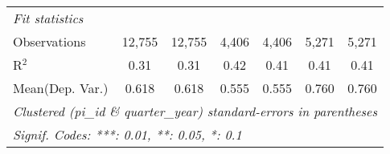 \begin{tabular}{lcccccc}
   \midrule
   \emph{Fit statistics}\\
   Observations                                                & 12,755        & 12,755        & 4,406         & 4,406         & 5,271          & 5,271\\  
   R$^2$                                                       & 0.31          & 0.31          & 0.42          & 0.41          & 0.41           & 0.41\\  
Mean(Dep. Var.) & 0.618 & 0.618 & 0.555 & 0.555 & 0.760 & 0.760 \\
   \midrule \midrule
   \multicolumn{7}{l}{\emph{Clustered (pi\_id \& quarter\_year) standard-errors in parentheses}}\\
   \multicolumn{7}{l}{\emph{Signif. Codes: ***: 0.01, **: 0.05, *: 0.1}}\\
\end{tabular}
\par\endgroup
